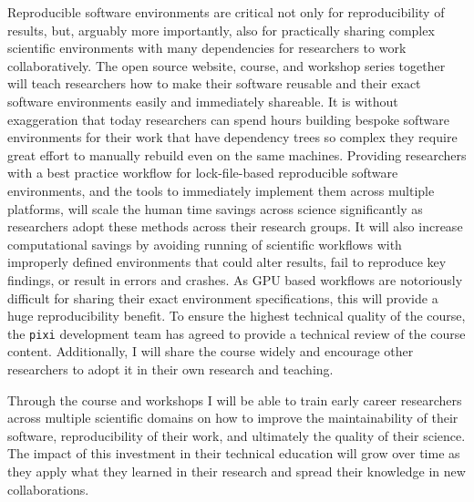 \documentclass[letterpaper, 11pt]{article}
\newcommand{\pixi}{\texttt{pixi}}
\begin{document}

Reproducible software environments are critical not only for reproducibility of results, but, arguably more importantly, also for practically sharing complex scientific environments with many dependencies for researchers to work collaboratively.
The open source website, course, and workshop series together will teach researchers how to make their software reusable and their exact software environments easily and immediately shareable.
It is without exaggeration that today researchers can spend hours building bespoke software environments for their work that have dependency trees so complex they require great effort to manually rebuild even on the same machines.
Providing researchers with a best practice workflow for lock-file-based reproducible software environments, and the tools to immediately implement them across multiple platforms, will scale the human time savings across science significantly as researchers adopt these methods across their research groups.
It will also increase computational savings by avoiding running of scientific workflows with improperly defined environments that could alter results, fail to reproduce key findings, or result in errors and crashes.
As GPU based workflows are notoriously difficult for sharing their exact environment specifications, this will provide a huge reproducibility benefit.
To ensure the highest technical quality of the course, the \pixi{} development team has agreed to provide a technical review of the course content.
Additionally, I will share the course widely and encourage other researchers to adopt it in their own research and teaching.

Through the course and workshops I will be able to train early career researchers across multiple scientific domains on how to improve the maintainability of their software, reproducibility of their work, and ultimately the quality of their science.
The impact of this investment in their technical education will grow over time as they apply what they learned in their research and spread their knowledge in new collaborations.
\end{document}
